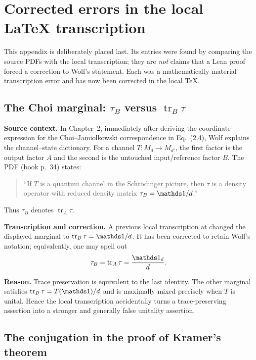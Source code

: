 \documentclass{article}
\begin{document}
\appendix
\section{Corrected errors in the local LaTeX transcription}
\label{app:transcription}

This appendix is deliberately placed last.  Its entries were found by comparing
the source PDFs with the local transcription; they are \emph{not} claims that a
Lean proof forced a correction to Wolf's statement.  Each was a mathematically
material transcription error and has now been corrected in the local TeX.

\subsection{The Choi marginal: $\tau_B$ versus $\operatorname{tr}_B\tau$}

\textbf{Source context.}  In Chapter~2, immediately after deriving the
coordinate expression for the Choi--Jamiolkowski correspondence in
Eq.~(2.4), Wolf explains the channel--state dictionary.  For a channel
$T:M_d\to M_{d'}$, the first factor is the output factor $A$ and the second is
the untouched input/reference factor $B$.  The PDF (book p.~34) states:
\begin{quote}
``If $T$ is a quantum channel in the Schr\"odinger picture, then $\tau$ is a
density operator with reduced density matrix $\tau_B=\one/d$.''
\end{quote}
Thus $\tau_B$ denotes $\operatorname{tr}_A\tau$.

\textbf{Transcription and correction.}  A previous local transcription at
 changed the displayed marginal to
$\operatorname{tr}_B\tau=\one/d$.  It has been corrected to retain Wolf's
notation; equivalently, one may spell out
\begin{equation}
  \tau_B=\operatorname{tr}_A\tau=\frac{\one_d}{d}.
\end{equation}

\textbf{Reason.}  Trace preservation is equivalent to the last identity.  The
other marginal satisfies $\operatorname{tr}_B\tau=T(\one)/d$ and is maximally
mixed precisely when $T$ is unital.  Hence the local transcription accidentally
turns a trace-preserving assertion into a stronger and generally false unitality
assertion.

\subsection{The conjugation in the proof of Kramer's theorem}
\end{document}
